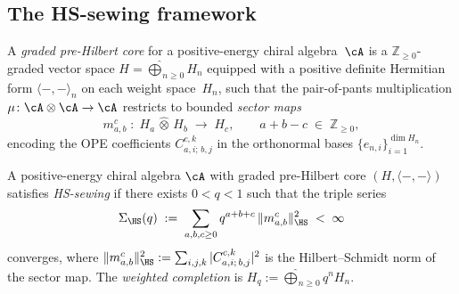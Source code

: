 %

%
%

\subsection{The HS-sewing framework}
\label{subsec:thqg-I-hs-sewing-framework}

\begin{definition}%
\label{def:g1-graded-pre-hilbert}%
%
A \emph{graded pre-Hilbert core} for a positive-energy chiral
algebra~$\cA$ is a $\mathbb{Z}_{\geq 0}$-graded vector space
$H = \widehat{\bigoplus}_{n \geq 0} H_n$ equipped with a positive
definite Hermitian form $\langle -, - \rangle_n$ on each weight
space~$H_n$, such that the pair-of-pants multiplication
$\mu \colon \cA \otimes \cA \to \cA$ restricts to bounded
\emph{sector maps}
\begin{equation}\label{eq:g1-sector-maps}
m_{a,b}^c \;\colon\; H_a \,\widehat{\otimes}\, H_b \;\longrightarrow\; H_c,
\qquad
a + b - c \;\in\; \mathbb{Z}_{\geq 0},
\end{equation}
encoding the OPE coefficients $C^{c,k}_{a,i;\,b,j}$ in the
orthonormal bases $\{e_{n,i}\}_{i=1}^{\dim H_n}$.
\end{definition}

\begin{definition}%
\label{def:g1-hs-sewing}%
%
A positive-energy chiral algebra $\cA$ with graded pre-Hilbert
core $(H, \langle -, - \rangle)$ satisfies \emph{HS-sewing}
if there exists $0 < q < 1$ such that the triple series
\begin{equation}\label{eq:g1-hs-sewing}
\Sigma_{\HS}(q)
\;:=\;
\sum_{a,b,c \geq 0} q^{a+b+c}\,\|m_{a,b}^c\|_{\HS}^2
\;<\;\infty
\end{equation}
converges, where $\|m_{a,b}^c\|_{\HS}^2 :=
\sum_{i,j,k} |C^{c,k}_{a,i;\,b,j}|^2$ is the Hilbert--Schmidt
norm of the sector map.  The \emph{weighted completion} is
$H_q := \widehat{\bigoplus}_{n \geq 0} q^n H_n$.
\end{definition}

